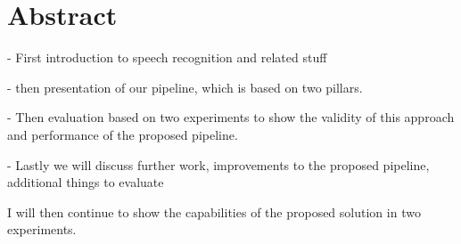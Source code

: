 


\chapter{Abstract}
- First introduction to speech recognition and related stuff

- then presentation of our pipeline, which is based on two pillars.

- Then evaluation based on two experiments to show the validity of this approach and performance of the proposed pipeline.

- Lastly we will discuss further work, improvements to the proposed pipeline, additional things to evaluate



I will then continue to show the capabilities of the proposed solution in two experiments.

